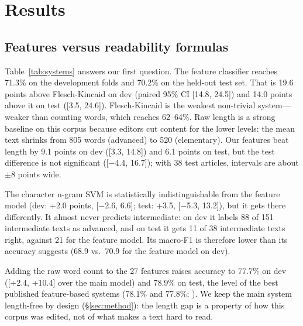 \section{Results}
\label{sec:results}

\begin{table}[t]
\centering\small

\caption{Three-way classification accuracy and macro-F1 (\%). Dev: out-of-fold predictions over 453 texts (151 articles), with the SD of accuracy across the 5 folds. Test: 114 texts (38 articles), evaluated once; 95\% CIs from the article-level bootstrap. ``+ word count'' is a secondary system added after the dev ablation (\S\ref{sec:ablation}).}
\label{tab:systems}
\end{table}

\subsection{Features versus readability formulas}

Table~\ref{tab:systems} answers our first question. The feature classifier reaches 71.3\% on the development folds and 70.2\% on the held-out test set. That is 19.6 points above Flesch-Kincaid on dev (paired 95\% CI [14.8, 24.5]) and 14.0 points above it on test ([3.5, 24.6]). Flesch-Kincaid is the weakest non-trivial system---weaker than counting words, which reaches 62--64\%. Raw length is a strong baseline on this corpus because editors cut content for the lower levels: the mean text shrinks from 805 words (advanced) to 520 (elementary). Our features beat length by 9.1 points on dev ([3.3, 14.8]) and 6.1 points on test, but the test difference is not significant ([$-$4.4, 16.7]); with 38 test articles, intervals are about $\pm$8 points wide.

The character n-gram SVM is statistically indistinguishable from the feature model (dev: +2.0 points, [$-$2.6, 6.6]; test: +3.5, [$-$5.3, 13.2]), but it gets there differently. It almost never predicts intermediate: on dev it labels 88 of 151 intermediate texts as advanced, and on test it gets 11 of 38 intermediate texts right, against 21 for the feature model. Its macro-F1 is therefore lower than its accuracy suggests (68.9 vs.\ 70.9 for the feature model on dev).

Adding the raw word count to the 27 features raises accuracy to 77.7\% on dev ([+2.4, +10.4] over the main model) and 78.9\% on test, the level of the best published feature-based systems (78.1\% and 77.8\%; \citealp{vajjala2018onestop,lee2021pushing}). We keep the main system length-free by design (\S\ref{sec:method}): the length gap is a property of how this corpus was edited, not of what makes a text hard to read.

